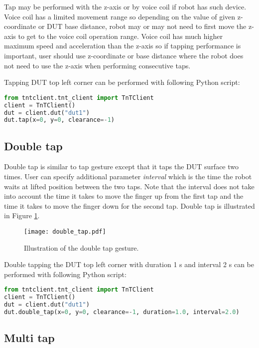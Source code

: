 Tap may be performed with the z-axis or by voice coil if robot has such device. Voice coil has a limited movement range so depending on the value of given z-coordinate or DUT base distance, robot may or may not need to first move the z-axis to get to the voice coil operation range. Voice coil has much higher maximum speed and acceleration than the z-axis so if tapping performance is important, user should use z-coordinate or base distance where the robot does not need to use the z-axis when performing consecutive taps.

Tapping DUT top left corner can be performed with following Python script:

\begin{lstlisting}[language=Python]
from tntclient.tnt_client import TnTClient
client = TnTClient()
dut = client.dut("dut1")
dut.tap(x=0, y=0, clearance=-1)
\end{lstlisting}

\subsection{Double tap}

Double tap is similar to tap gesture except that it taps the DUT surface two times. User can specify additional parameter \emph{interval} which is the time the robot waits at lifted position between the two taps. Note that the interval does not take into account the time it takes to move the finger up from the first tap and the time it takes to move the finger down for the second tap. 
Double tap is illustrated in Figure \ref{fig:double_tap_gesture}.

\begin{figure}[h]
	\centering
	\texttt{[image: double\_tap.pdf]}
	\caption{Illustration of the double tap gesture.}
	\label{fig:double_tap_gesture}
\end{figure}

Double tapping the DUT top left corner with duration 1 s and interval 2 s can be performed with following Python script:

\begin{lstlisting}[language=Python]
from tntclient.tnt_client import TnTClient
client = TnTClient()
dut = client.dut("dut1")
dut.double_tap(x=0, y=0, clearance=-1, duration=1.0, interval=2.0)
\end{lstlisting}

\subsection{Multi tap}

